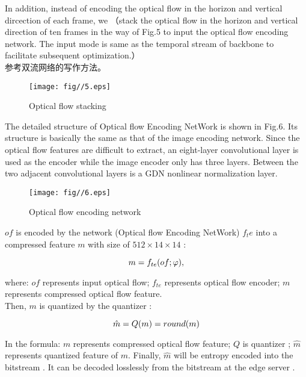 \documentclass[a4paper]{cas-sc}
\begin{document}
In addition, instead of encoding the optical flow in the horizon and vertical dircection of each frame, 
we （stack the optical flow in the horizon and vertical direction of  ten frames in the way of Fig.5 
to input the optical flow encoding network. 
The input mode  is same as the temporal stream of backbone to facilitate subsequent optimization.）\\
参考双流网络的写作方法。

\begin{figure}[ht]
	\centering
		\texttt{[image: fig//5.eps]}
	  \caption{Optical flow stacking}\label{fig.5}
\end{figure}

The detailed structure of Optical flow Encoding NetWork  is shown in Fig.6.   
Its structure is basically the same as that of the image encoding network. 
Since the optical flow features are difficult to extract, an eight-layer convolutional layer is used as the encoder 
while the image encoder only has three layers.
Between the two adjacent convolutional layers is a GDN nonlinear normalization layer.\\

\begin{figure}[ht]
	\centering
		\texttt{[image: fig//6.eps]}
	  \caption{Optical flow encoding network}\label{fig.6}
\end{figure}

$of$ is encoded by the network (Optical flow Encoding NetWork) $f_te$
into a compressed feature $m$ with size of $512\times14\times14$ :

\begin{equation}
  \centering
    m=f_{te}(of;\varphi),
\end{equation}
 

where: $of$ represents input optical flow; 
$f_{te}$ represents optical flow encoder; 
$m$ represents compressed optical flow feature.\\

Then, $m$ is quantized by the quantizer :

\begin{equation}
  \centering
    \hat{m}=Q(m)=round(m)
\end{equation}
					  
In the formula: $m$ represents compressed optical flow feature; $Q$ is quantizer ; $\hat{m}$ represents quantized feature of $m$.
Finally, $\hat{m}$ will be entropy encoded into the bitstream . 
It can be decoded losslessly from the bitstream at the edge server .\\
\end{document}
